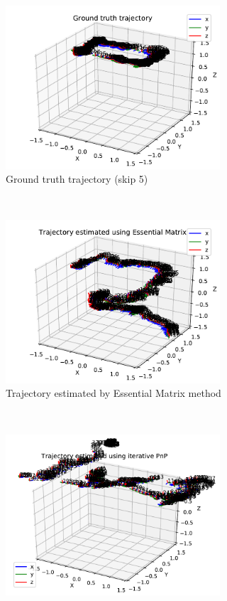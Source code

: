\documentclass[12pt,a4paper]{article}
\begin{document}
     \begin{figure}[p]
      \begin{subfigure}[t]{0.5\textwidth}
      \centering
        \includegraphics[width=80mm]{../quad/basic-reg-saves-S1b/5/atrj_gt.pdf}
        \caption{Ground truth trajectory (skip 5)}
      \end{subfigure} %
      ~
      \begin{subfigure}[t]{0.5\textwidth}
        \includegraphics[width=80mm]{../quad/basic-reg-saves-S1b/5/atrj_rgb.pdf}
        \caption{Trajectory estimated by Essential Matrix method}
      \end{subfigure} 
      \\
      \begin{subfigure}[t]{0.5\textwidth}
        \includegraphics[width=80mm]{../quad/basic-reg-saves-S1b/5/atrj_pnp.pdf}

\end{subfigure}
\end{figure}
\end{document}
